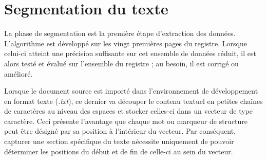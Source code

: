 \section{Segmentation du texte}
La phase de segmentation est la première étape d'extraction des données.
L'algorithme est développé sur les vingt premières pages du registre. Lorsque celui-ci atteint une précision suffisante sur cet ensemble de données réduit, il est alors testé et évalué sur l'ensemble du registre ; au besoin, il est corrigé ou amélioré.

Lorsque le document source est importé dans l'environnement de développement en format texte (\textit{.txt}), ce dernier va découper le contenu textuel en petites chaînes de caractères au niveau des espaces et stocker celles-ci dans un vecteur de type caractère. Ceci présente l'avantage que chaque mot ou marqueur de structure peut être désigné par sa position à l'intérieur du vecteur. Par conséquent, capturer une section spécifique du texte nécessite uniquement de pouvoir déterminer les positions du début et de fin de celle-ci au sein du vecteur.  

